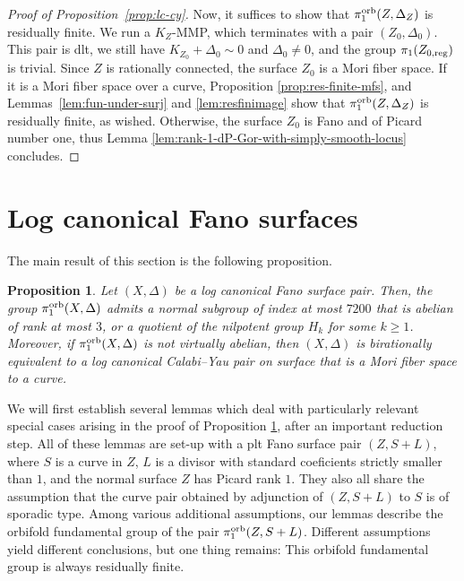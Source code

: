 \documentclass{amsart}
\newtheorem{proposition}[theorem]{Proposition}
\theoremstyle{definition}
\theoremstyle{remark}
\numberwithin{equation}{section}
\begin{document}
\begin{proof}[Proof of Proposition~\ref{prop:lc-cy}]
\hfill \begin{minipage}{0.95\textwidth}
Now, it suffices to show that $\pi_1^{\rm orb}(Z,\Delta_Z)$ is residually finite. We run a $K_Z$-MMP, which terminates with a pair $(Z_0,\Delta_0)$. This pair is dlt, we still have $K_{Z_0}+\Delta_0\sim 0$ and $\Delta_0\neq 0$, and the group $\pi_1(Z_{0,{\rm reg}})$ is trivial. Since $Z$ is rationally connected, the surface $Z_0$ is a Mori fiber space. If it is a Mori fiber space over a curve, Proposition \ref{prop:res-finite-mfs}, and Lemmas~\ref{lem:fun-under-surj} and \ref{lem:resfinimage} show that $\pi_1^{\rm orb}(Z,\Delta_{Z})$ is residually finite, as wished. Otherwise, the surface $Z_0$ is Fano and of Picard number one, thus Lemma \ref{lem:rank-1-dP-Gor-with-simply-smooth-locus} concludes.
\end{minipage}
\end{proof}

\section{Log canonical Fano surfaces} 
The main result of this section is the following proposition.

\begin{proposition}\label{prop:lc-Fano-case}
Let $(X,\Delta)$ be a log canonical Fano surface pair.
Then, the group $\pi_1^{\rm orb}(X,\Delta)$ admits a normal subgroup of index at most $7200$ that is abelian of rank at most $3$, or a quotient of the nilpotent group $H_k$ for some $k\ge 1$. Moreover, if $\pi_1^{\rm orb}(X,\Delta)$ is not virtually abelian, then $(X,\Delta)$ is birationally equivalent to a log canonical Calabi--Yau pair on surface that is a Mori fiber space to a curve.
\end{proposition}

We will first establish several lemmas which deal with particularly relevant special cases arising in the proof of Proposition \ref{prop:lc-Fano-case}, after an important reduction step. All of these lemmas are set-up with a plt Fano surface pair $(Z,S+L)$, where
$S$ is a curve in $Z$, $L$ is a divisor with standard coeficients strictly smaller than $1$, and the normal surface $Z$ has Picard rank $1$. They also all share the assumption that the curve pair obtained by adjunction of $(Z,S+L)$ to $S$ is of sporadic type. Among various additional assumptions, our lemmas describe the orbifold fundamental group of the pair $\pi_1^{\rm orb}(Z,S+L)$. Different assumptions yield different conclusions, but one thing remains: This orbifold fundamental group is always residually finite.
\end{document}
